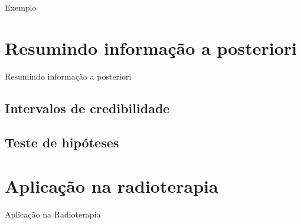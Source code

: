 \documentclass{beamer}
\theoremstyle{definition}
\begin{document}
\begin{frame}{Exemplo}
    
\end{frame}

\section{Resumindo informação a posteriori}

\begin{frame}{Resumindo informação a posteriori}
\subsection{Intervalos de credibilidade}

\subsection{Teste de hipóteses}
    
\end{frame}

\section{Aplicação na radioterapia}

\begin{frame}{Aplicação na Radioterapia}
    
\end{frame}
 
\end{document}
